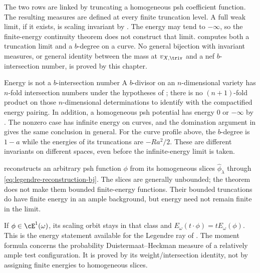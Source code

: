 The two rows are linked by truncating a homogeneous psh coefficient
function. The resulting measures are defined at every finite truncation
level. A full weak limit, if it exists, is scaling invariant by
. The energy may tend to $-\infty$,
so the finite-energy continuity theorem does not construct that limit.
 computes both a truncation limit
and a $b$-degree on a curve. No general bijection with invariant measures,
or general identity between the mass at $v_{X,\triv}$ and a nef
$b$-intersection number, is proved by this chapter.

\begin{warning}{Energy is not a $b$-intersection number}
\label{warn:ch46-energy-not-bdivisor}
A $b$-divisor on an $n$-dimensional variety has $n$-fold intersection
numbers under the hypotheses of ; there
is no $(n+1)$-fold product on those $n$-dimensional determinations to
identify with the compactified energy pairing. In addition, a homogeneous
psh potential has energy $0$ or $-\infty$ by
. The nonzero case has infinite
energy on curves, and the domination argument in
 gives the same conclusion in general.
For the curve profile above, the $b$-degree is $1-a$ while the energies
of its truncations are $-Ra^2/2$. These are different invariants on
different spaces, even before the infinite-energy limit is taken.
\end{warning}

\begin{remark}
\label{rem:ch46-legendre}
 reconstructs an arbitrary
psh function $\phi$ from its homogeneous slices
$\widehat\phi_\lambda$ through \eqref{eq:legendre-reconstruction-bj}.
The slices are generally unbounded; the theorem does not make them bounded
finite-energy functions. Their bounded truncations do have finite energy
in an ample background, but energy need not remain finite in the limit.

If $\phi\in\cE^1(\omega)$, its scaling orbit stays in that class and
$E_\omega(t\cdot\phi)=tE_\omega(\phi)$. This is the energy statement
available for the Legendre ray of .
The moment formula  concerns the probability
Duistermaat--Heckman measure of a relatively ample test configuration.
It is proved by its weight/intersection identity, not by assigning finite
energies to homogeneous slices.
\end{remark}


